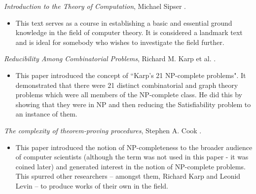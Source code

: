 \documentclass[11pt]{article}
\theoremstyle{definition}
\begin{document}
        \begin{basedescript}{\desclabelstyle{\nextlinelabel}}
          \setlength{\itemsep}{1pt}
          \setlength{\parskip}{0pt}
          \setlength{\parsep}{0pt}
          \item \textit{Introduction to the Theory of Computation}, Michael Sipser \cite{Sipser:2005}.
          \begin{itemize}
            \renewcommand{\labelitemi}{--}
            \item  This text serves as a course in establishing a basic and essential ground knowledge in the field of computer theory. It is considered a landmark text and is ideal for somebody who wishes to investigate the field further.   
          \end{itemize}
          \item \textit{Reducibility Among Combinatorial Problems}, Richard M. Karp et al. \cite{citeulike:Karp}.
          \begin{itemize}
             \renewcommand{\labelitemi}{--} 
            \item This paper introduced the concept of ``Karp's 21 NP-complete problems". It demonstrated that there were 21 distinct combinatorial and graph theory problems which were all members of the NP-complete class. He did this by showing that they were in NP and then reducing the Satisfiability problem to an instance of them.   
          \end{itemize}
          \item \textit{The complexity of theorem-proving procedures}, Stephen A. Cook \cite{citeulike:Cook}.
        \begin{itemize}
          \renewcommand{\labelitemi}{--} 
          \item This paper introduced the notion of NP-completeness to the broader audience of computer scientists (although the term was not used in this paper - it was coined later) and generated interest in the notion of NP-complete problems. This spurred other researchers -- amongst them, Richard Karp and Leonid Levin -- to produce works of their own in the field.
 

\end{itemize}
\end{basedescript}
\end{document}
